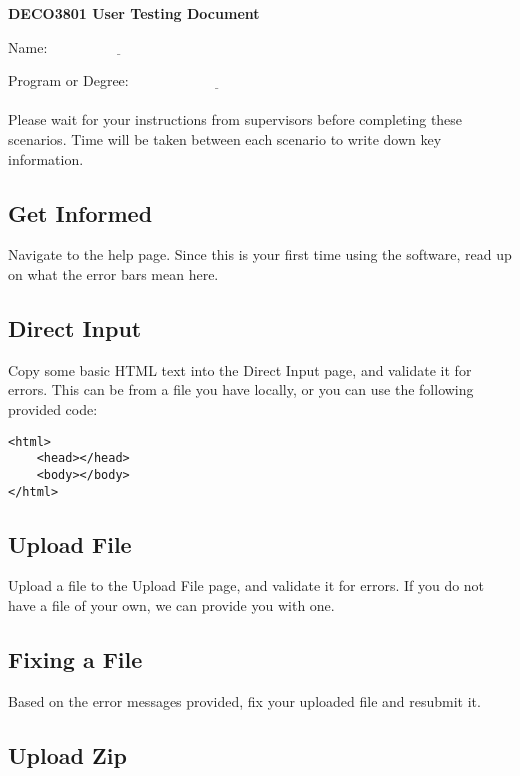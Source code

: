 \begin{center}
\textbf{DECO3801 User Testing Document}
\end{center}

Name: $\underline{\hspace{4cm}}$

Program or Degree: $\underline{\hspace{5cm}}$ \\ \\

Please wait for your instructions from supervisors before completing these scenarios. Time will be taken between each scenario to write down key information.

\subsection*{Get Informed}

Navigate to the help page. Since this is your first time using the software, read up on what the error bars mean here.

\subsection*{Direct Input}

Copy some basic HTML text into the Direct Input page, and validate it for errors. This can be from a file you have locally, or you can use the following provided code:
\begin{verbatim}
<html>
	<head></head>
	<body></body>
</html>
\end{verbatim}

\subsection*{Upload File}

Upload a file to the Upload File page, and validate it for errors. If you do not have a file of your own, we can provide you with one.

\subsection*{Fixing a File}

Based on the error messages provided, fix your uploaded file and resubmit it.

\subsection*{Upload Zip}

